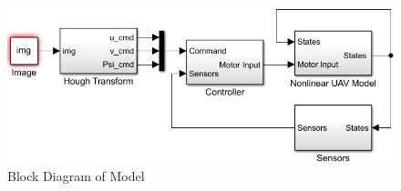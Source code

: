 \documentclass[10pt,twocolumn,letterpaper]{article}
\begin{document}
%	
%	
%		
%		
	
	\begin{figure}[!t] %
		\begin{center}
		\includegraphics[width=\linewidth]{matlab/block_model}
		\end{center}
		\caption{Block Diagram of Model}
		\label{fig:block_model}
	\end{figure}
	
	
\end{document}
